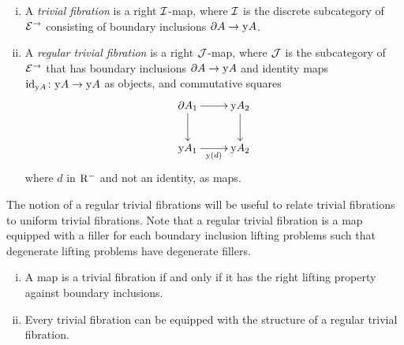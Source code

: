 \documentclass[reqno,10pt,a4paper,oneside]{amsart}
\begin{document}
\begin{definition} \hfill
\begin{enumerate}[(i)]
\item A \emph{trivial fibration} is a right $\cal{I}$-map, where $\cal{I}$ is the discrete subcategory of $\cal{E}^{\to}$ consisting of boundary inclusions $\partial A \to \yon A$.
\item A \emph{regular trivial fibration} is a right $\cal{J}$-map, where $\cal{J}$ is the subcategory of~$\cal{E}^{\to}$ that has boundary inclusions $\partial A \to \yon A$ and identity maps $\id_{\yon A} \co \yon A \to \yon A$ as objects, and commutative squares
\[
\xymatrix{
  \partial A_1
  \ar[r]
  \ar[d]
&
  \yon A_2
  \ar[d]
\\
  \yon A_1
  \ar[r]_{\yon(d)}
&
  \yon A_2
}
\]
where $d$ in $\Rm$ and not an identity, as maps.
\end{enumerate}
\end{definition}

The notion of a regular trivial fibrations will be useful to relate trivial fibrations to uniform trivial fibrations.
Note that a regular trivial fibration is a map equipped with a filler for each boundary inclusion lifting problems such that degenerate lifting problems have degenerate fillers.




\begin{proposition} \label{trivial-fibration-to-regular} \hfill
\begin{enumerate}[(i)]
\item A map is a trivial fibration if and only if it has the right lifting property against boundary inclusions.
\item Every trivial fibration can be equipped with the structure of a regular trivial fibration.
\end{enumerate}
\end{proposition}
\end{document}
